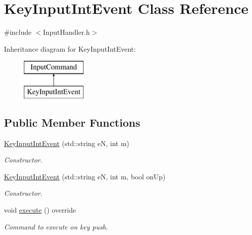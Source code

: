 \hypertarget{class_key_input_int_event}{\section{Key\+Input\+Int\+Event Class Reference}
\label{class_key_input_int_event}
}


{\ttfamily \#include $<$Input\+Handler.\+h$>$}

Inheritance diagram for Key\+Input\+Int\+Event\+:\begin{figure}[H]
\begin{center}
\leavevmode
\includegraphics[height=2.000000cm]{class_key_input_int_event}
\end{center}
\end{figure}
\subsection*{Public Member Functions}
\begin{DoxyCompactItemize}
\item 
\hypertarget{class_key_input_int_event_ab0dc443f0aa8131afc0ef8c27a7e0d05}{\hyperlink{class_key_input_int_event_ab0dc443f0aa8131afc0ef8c27a7e0d05}{Key\+Input\+Int\+Event} (std\+::string e\+N, int m)}\label{class_key_input_int_event_ab0dc443f0aa8131afc0ef8c27a7e0d05}

\begin{DoxyCompactList}\small\item\em Constructor. \end{DoxyCompactList}\item 
\hypertarget{class_key_input_int_event_a4985a95069905f4f2b28bbf04f4050af}{\hyperlink{class_key_input_int_event_a4985a95069905f4f2b28bbf04f4050af}{Key\+Input\+Int\+Event} (std\+::string e\+N, int m, bool on\+Up)}\label{class_key_input_int_event_a4985a95069905f4f2b28bbf04f4050af}

\begin{DoxyCompactList}\small\item\em Constructor. \end{DoxyCompactList}\item 
\hypertarget{class_key_input_int_event_af50e070eb50e9204ef0f1d6d8cfec4ba}{void \hyperlink{class_key_input_int_event_af50e070eb50e9204ef0f1d6d8cfec4ba}{execute} () override}\label{class_key_input_int_event_af50e070eb50e9204ef0f1d6d8cfec4ba}

\begin{DoxyCompactList}\small\item\em Command to execute on key push. \end{DoxyCompactList}\end{DoxyCompactItemize}
